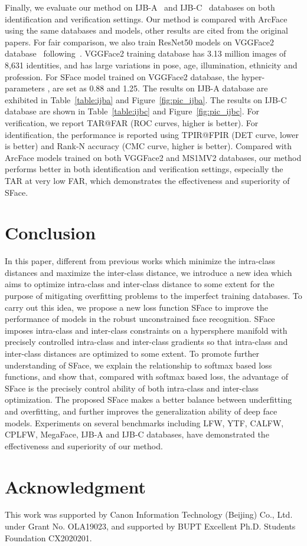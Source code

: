 \documentclass[journal,comsoc]{IEEEtran}
\begin{document}
Finally, we evaluate our method on IJB-A~\cite{klare2015pushing} and IJB-C~\cite{maze2018iarpa} databases on both identification and verification settings. Our method is compared with ArcFace using the same databases and models, other results are cited from the original papers. For fair comparison, we also train ResNet50 models on VGGFace2 database~\cite{Cao18} following~\cite{deng2019arcface}. VGGFace2 training database has 3.13 million images of 8,631 identities, and has large variations in pose, age, illumination, ethnicity and profession. For SFace model trained on VGGFace2 database, the hyper-parameters ,  are set as 0.88 and 1.25. The results on IJB-A database are exhibited in Table~\ref{table:ijba} and Figure~\ref{fig:pic_ijba}. The results on IJB-C database are shown in Table~\ref{table:ijbc} and Figure~\ref{fig:pic_ijbc}. For verification, we report TAR@FAR (ROC curves, higher is better). For identification, the performance is reported using TPIR@FPIR (DET curve, lower is better) and Rank-N accuracy (CMC curve, higher is better). Compared with ArcFace models trained on both VGGFace2 and MS1MV2 databases, our method performs better in both identification and verification settings, especially the TAR at very low FAR, which demonstrates the effectiveness and superiority of SFace. 

\section{Conclusion}
\label{sec:conclusion}
In this paper, different from previous works which minimize the intra-class distances and maximize the inter-class distance, we introduce a new idea which aims to optimize intra-class and inter-class distance to some extent for the purpose of mitigating overfitting problems to the imperfect training databases. To carry out this idea, we propose a new loss function SFace to improve the performance of models in the robust unconstrained face recognition. SFace imposes intra-class and inter-class constraints on a hypersphere manifold with precisely controlled intra-class and inter-class gradients so that intra-class and inter-class distances are optimized to some extent. To promote further understanding of SFace, we explain the relationship to softmax based loss functions, and show that, compared with softmax based loss, the advantage of SFace is the precisely control ability of both intra-class and inter-class optimization. The proposed SFace makes a better balance between underfitting and overfitting, and further improves the generalization ability of deep face models. Experiments on several benchmarks including LFW, YTF, CALFW, CPLFW, MegaFace, IJB-A and IJB-C databases, have demonstrated the effectiveness and superiority of our method. 

\section*{Acknowledgment}
This work was supported by Canon
Information Technology (Beijing) Co., Ltd. under Grant
No. OLA19023, and supported by BUPT Excellent Ph.D. Students Foundation CX2020201.

\ifCLASSOPTIONcaptionsoff
\newpage
\fi
	


	
\end{document}
